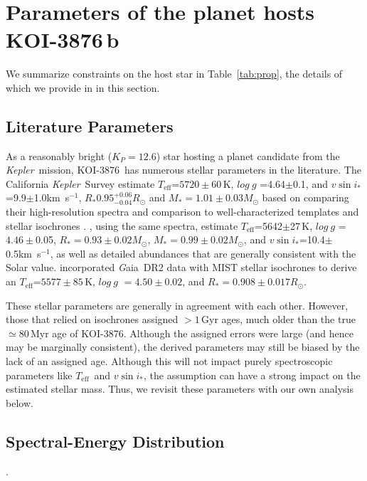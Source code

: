 \documentclass[twocolumn]{aastex631}
\newcommand{\starname}{KOI-3876}
\newcommand{\planetname}{KOI-3876\,b}
\newcommand{\vsini}{$v\sin{i_*}$}
\newcommand{\kepler}{{\it Kepler}}
\newcommand{\logg}{$log~g$ }
\newcommand{\teff}{\ensuremath{T_{\text{eff}}}}
\newcommand\kms{km~s$^{-1}$}
\newcommand{\gaia}{{\textit Gaia}}
\begin{document}


\section{Parameters of the planet hosts \planetname}\label{sec:stellar_params}

We summarize constraints on the host star in Table~\ref{tab:prop}, the details of which we provide in in this section. 

\subsection{Literature Parameters}
As a reasonably bright ($K_P=12.6$) star hosting a planet candidate from the \kepler\ mission, \starname\ has numerous stellar parameters in the literature. The California \kepler\ Survey estimate \teff=$5720\pm60$\,K, \logg=4.64$\pm$0.1, and \vsini=9.9$\pm$1.0\kms, $R_*0.95^{+0.06}_{-0.04}R_\odot$ and $M_*=1.01\pm0.03M_\odot$ based on comparing their high-resolution spectra and comparison to well-characterized templates \citep{2017AJ....154..107P, 2017ApJ...836...77Y} and stellar isochrones \citep{JohsonCKS2017}. \citet{2018ApJS..237...38B}, using the same spectra, estimate \teff=5642$\pm$27\,K, \logg=$4.46\pm$0.05, $R_*=0.93\pm0.02M_\odot$, $M_*=0.99\pm0.02M_\odot$, and \vsini=10.4$\pm$0.5\kms, as well as detailed abundances that are generally consistent with the Solar value. \citet{2020AJ....160..108B} incorporated \gaia\ DR2 data with MIST stellar isochrones to derive an \teff=$5577\pm85$\,K, \logg$=4.50\pm0.02$, and $R_*=0.908\pm0.017R_\odot$. 

These stellar parameters are generally in agreement with each other. However, those that relied on isochrones \citep{JohsonCKS2017, 2018ApJS..237...38B, 2020AJ....160..108B} assigned $>1$\,Gyr ages, much older than the true $\simeq$80\,Myr age of \starname. Although the assigned errors were large (and hence may be marginally consistent), the derived parameters may still be biased by the lack of an assigned age. Although this will not impact purely spectroscopic parameters like \teff\ and \vsini, the assumption can have a strong impact on the estimated stellar mass. Thus, we revisit these parameters with our own analysis below. 

\subsection{Spectral-Energy Distribution}.
\end{document}
